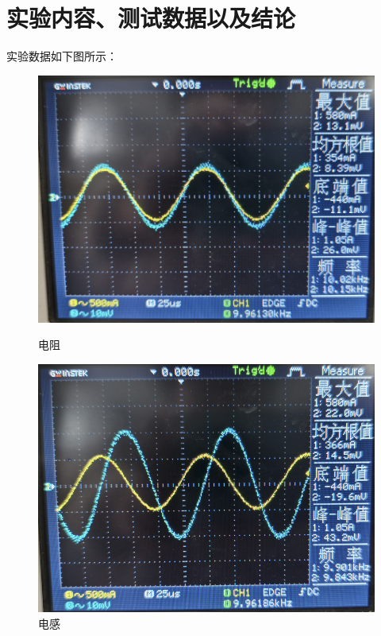 \documentclass[10pt, a4paper]{article} %
\begin{document}
\section{实验内容、测试数据以及结论}
实验数据如下图所示：
\begin{figure}[ht]
    \centering
    \begin{minipage}[ht]{0.3\textwidth}
        \centering
        \includegraphics[width=\linewidth]{image/3.png}
        \caption{电阻}
        \label{fig:side:c}
    \end{minipage}
    \hfill
    \begin{minipage}[ht]{0.3\textwidth}
        \centering
        \includegraphics[width=\linewidth]{image/4.png}
        \caption{电感}
        \label{fig:side:d}

\end{minipage}
\end{figure}
\end{document}
